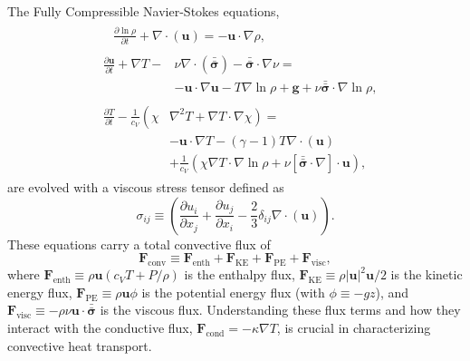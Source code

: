 \documentclass[aps, prl, twocolumn, nofootinbib, groupedaddress, amsfonts, amssymb, amsmath]{revtex4-1}
\newcommand{\Div}[1]{\ensuremath{\nabla\cdot\left( #1\right)}}
\newcommand{\grad}{\ensuremath{\nabla}}
\newcommand{\lilstressT}{\ensuremath{\bm{\bar{\bar{\sigma}}}}}
\begin{document}
The Fully Compressible Navier-Stokes equations,
\begin{align}
&\begin{aligned}
&\frac{\partial \ln\rho}{\partial t} + \Div{\bm{u}} = -\bm{u}\cdot\grad\rho,
	\label{eqn:continuity_eqn}
\end{aligned}\\
&\begin{aligned}
\frac{\partial\bm{u}}{\partial t} + \grad T - &\nu\Div{\lilstressT} - \lilstressT\cdot\grad\nu = \\
&-\bm{u}\cdot\grad\bm{u} - T\grad\ln\rho + \bm{g} + \nu\lilstressT\cdot\grad\ln\rho,
\label{eqn:momentum_eqn}
\end{aligned}\\
&\begin{aligned}
\frac{\partial T}{\partial t} -\frac{1}{c_V}\left(\right.\chi&\left.\grad^2 T + \grad T\cdot\grad\chi\right) = \\
	&-\bm{u}\cdot\grad T - (\gamma-1)T\Div{\bm{u}} \\
	&+ \frac{1}{c_V}\left(\chi\grad T \cdot\grad\ln\rho +\nu\left[\lilstressT\cdot\nabla\right]\cdot\bm{u}\right), 
	\label{eqn:energy_eqn}
\end{aligned}
\end{align}
are evolved with a viscous stress tensor defined as
\begin{equation}
\sigma_{ij} \equiv \left(\frac{\partial u_i}{\partial x_j} + \frac{\partial u_j}{\partial x_i} - \frac{2}{3}\delta_{ij}\Div{\bm{u}}\right).
	\label{eqn:stress_tensor}
\end{equation}
These equations carry a total convective flux of
\begin{equation}
\bm{F}_{\text{conv}} \equiv \bm{F}_{\text{enth}} + \bm{F}_{\text{KE}} + \bm{F}_{\text{PE}} + \bm{F}_{\text{visc}},
\end{equation}
where $\bm{F}_{\text{enth}} \equiv \rho\bm{u}(c_V T + P/\rho)$ is the enthalpy flux, $\bm{F}_{\text{KE}} \equiv 
\rho|\bm{u}|^2\bm{u}/2$ is the kinetic energy flux, $\bm{F}_{\text{PE}} \equiv \rho\bm{u}\phi$ is the potential
energy flux (with $\phi \equiv -gz$), 
and $\bm{F}_{\text{visc}} \equiv -\rho\nu\bm{u}\cdot\lilstressT$ is the viscous flux. 
Understanding these flux terms and how they interact with the conductive flux, 
$\bm{F}_{\text{cond}} = -\kappa \grad T$, is crucial in characterizing
convective heat transport.
\end{document}
